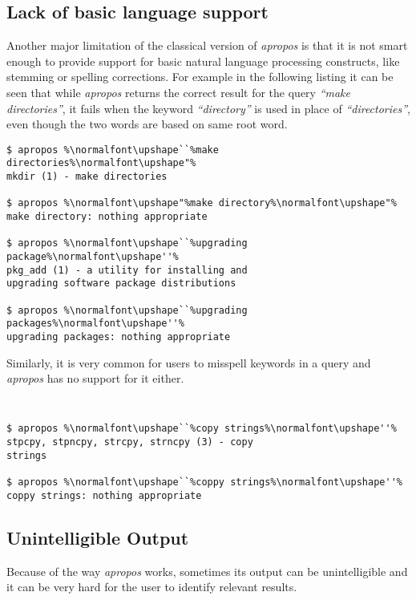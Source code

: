\documentclass[letterpaper,twocolumn,10pt]{article}
\begin{document}
\subsection{Lack of basic language support}
Another major limitation of the classical version of \textit{apropos} is that
it is not smart enough to provide support for basic natural language processing
constructs,
like stemming or spelling corrections.
For example in the following listing it can be seen
that while \textit{apropos} returns the correct result for the query
\textit{``make directories''}, it fails when the keyword \textit{``directory''}
is used in place of \textit{``directories''}, even though the two words are based
on same root word. \\

{\small
{}
\begin{lstlisting}
$ apropos %\normalfont\upshape``%make directories%\normalfont\upshape"%
mkdir (1) - make directories

$ apropos %\normalfont\upshape"%make directory%\normalfont\upshape"%
make directory: nothing appropriate

$ apropos %\normalfont\upshape``%upgrading package%\normalfont\upshape''%
pkg_add (1) - a utility for installing and
upgrading software package distributions

$ apropos %\normalfont\upshape``%upgrading packages%\normalfont\upshape''%
upgrading packages: nothing appropriate
\end{lstlisting}
}


Similarly, it is very common for users to misspell keywords in a query and \textit{apropos} has no support for it either.

{\tt \small
{}
\begin{lstlisting}
$ apropos %\normalfont\upshape``%copy strings%\normalfont\upshape''%
stpcpy, stpncpy, strcpy, strncpy (3) - copy
strings

$ apropos %\normalfont\upshape``%coppy strings%\normalfont\upshape''%
coppy strings: nothing appropriate
\end{lstlisting}
}

\subsection{Unintelligible Output}
Because of the way \textit{apropos} works, sometimes its output can be
unintelligible and it can be very hard for the user to identify relevant results. \\
\end{document}
